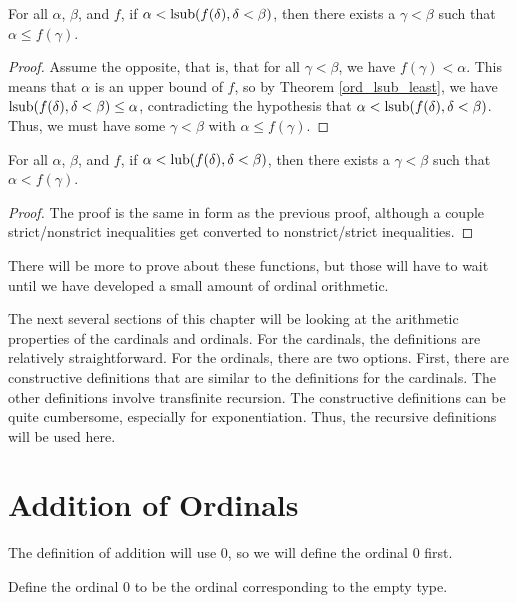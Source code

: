 \documentclass[../../math.tex]{subfiles}
\begin{document}
\begin{theorem} \label{ord_lsub_in}
    For all $\alpha$, $\beta$, and $f$, if $\alpha < \operatorname{lsub}(f(\delta), \delta <
    \beta)$, then there exists a $\gamma < \beta$ such that $\alpha \leq
    f(\gamma)$.
\end{theorem}
\begin{proof}
    Assume the opposite, that is, that for all $\gamma < \beta$, we have
    $f(\gamma) < \alpha$.  This means that $\alpha$ is an upper bound of $f$, so
    by Theorem \ref{ord_lsub_least}, we have $\operatorname{lsub}(f(\delta), \delta < \beta)
    \leq \alpha$, contradicting the hypothesis that $\alpha < \operatorname{lsub}(f(\delta),
    \delta < \beta)$.  Thus, we must have some $\gamma < \beta$ with $\alpha
    \leq f(\gamma)$.
\end{proof}

\begin{theorem} \label{ord_lub_in}
    For all $\alpha$, $\beta$, and $f$, if $\alpha < \operatorname{lub}(f(\delta), \delta <
    \beta)$, then there exists a $\gamma < \beta$ such that $\alpha <
    f(\gamma)$.
\end{theorem}
\begin{proof}
    The proof is the same in form as the previous proof, although a couple
    strict/nonstrict inequalities get converted to nonstrict/strict
    inequalities.
\end{proof}

There will be more to prove about these functions, but those will have to wait
until we have developed a small amount of ordinal orithmetic.

The next several sections of this chapter will be looking at the arithmetic
properties of the cardinals and ordinals.  For the cardinals, the definitions
are relatively straightforward.  For the ordinals, there are two options.
First, there are constructive definitions that are similar to the definitions
for the cardinals.  The other definitions involve transfinite recursion.  The
constructive definitions can be quite cumbersome, especially for exponentiation.
Thus, the recursive definitions will be used here.

\section{Addition of Ordinals}

The definition of addition will use $0$, so we will define the ordinal $0$
first.

\begin{instance}
    Define the ordinal $0$ to be the ordinal corresponding to the empty type.
\end{instance}
\end{document}
